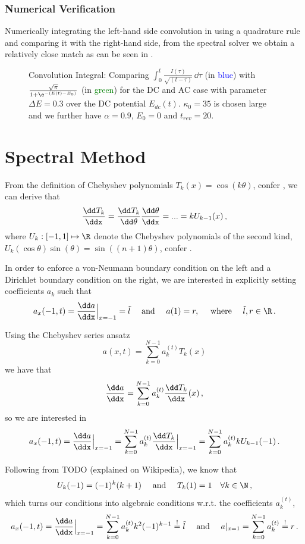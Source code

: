 \documentclass{prettytex/ox/mmsc-special-topic}
\begin{document}
  \subsubsection{Numerical Verification}
  Numerically integrating the left-hand side convolution in  using a quadrature rule and comparing it with the right-hand side, from the spectral solver we obtain a relatively close match as can be seen in .
  \begin{figure}[H]
    \centering
    \caption{Convolution Integral: Comparing $\int_{0}^{t} \frac{I(\tau)}{\sqrt{(t - \tau)}} \,\dd\tau$ (in \textcolor{blue}{blue}) with $\frac{\sqrt{\pi}}{1 + \e^{-(E(t) - E_0)}}$ (in \textcolor{green}{green}) for the DC and AC case with parameter $\Delta E = 0.3$ over the DC potential $E_{dc}(t)$. $\kappa_0 = 35$ is chosen large and we further have $\alpha = 0.9$, $E_0 = 0$ and $t_{rev} = 20$.}
    \label{fig:voltammetry-convolution}
  \end{figure}

  \section{Spectral Method}
  From the definition of Chebyshev polynomials $T_k(x) = \cos(k\theta)$, confer , we can derive that
  $$\frac{\dd T_k}{\ddx} = \frac{\dd T_k}{\dd\theta} \frac{\dd\theta}{\ddx} = ... = k U_{k-1}(x)\,,$$
  where $U_k: [-1, 1] \mapsto \R$ denote the Chebyshev polynomials of the second kind, $U_k(\cos \theta) \sin(\theta) = \sin\left((n+1) \theta\right)$, confer .

  In order to enforce a von-Neumann boundary condition on the left and a Dirichlet boundary condition on the right,
  we are interested in explicitly setting coefficients $a_k$ such that
  $$a_x(-1, t) = \frac{\dd a}{\ddx}\Big|_{x=-1} = \tilde{l} \quad \text{ and } \quad a(1) = r, \quad \text{ where } \quad \tilde{l}, r \in \R\,.$$

  Using the Chebyshev series ansatz
  $$a(x, t) = \sum_{k=0}^{N-1} a_k^{(t)} T_k(x)$$
  we have that
  $$\frac{\dd a}{\ddx} = \sum_{k=0}^{N-1} a_k^{(t)} \frac{\dd T_k}{\ddx}(x)\,,$$
  so we are interested in
  $$a_x(-1, t) = \frac{\dd a}{\ddx}\Big|_{x=-1} = \sum_{k=0}^{N-1} a_k^{(t)} \frac{\dd T_k}{\ddx}\Big|_{x=-1} = \sum_{k=0}^{N-1} a_k^{(t)} k U_{k-1}(-1)\,.$$

  Following from TODO (explained on Wikipedia), we know that
  $$U_k(-1) = (-1)^k (k+1) \quad \text{ and } \quad T_k(1) = 1 \quad \forall k \in \N\,,$$
  which turns our conditions into algebraic conditions w.r.t. the coefficients $a_k^{(t)}$,
  $$a_x(-1, t) = \frac{\dd a}{\ddx}\Big|_{x=-1} = \sum_{k=0}^{N-1} a_k^{(t)} k^2 (-1)^{k-1} \overset{!}{=} \tilde{l} \quad \text{ and } \quad a|_{x=1} = \sum_{k=0}^{N-1} a_k^{(t)} \overset{!}{=} r\,.$$
\end{document}
